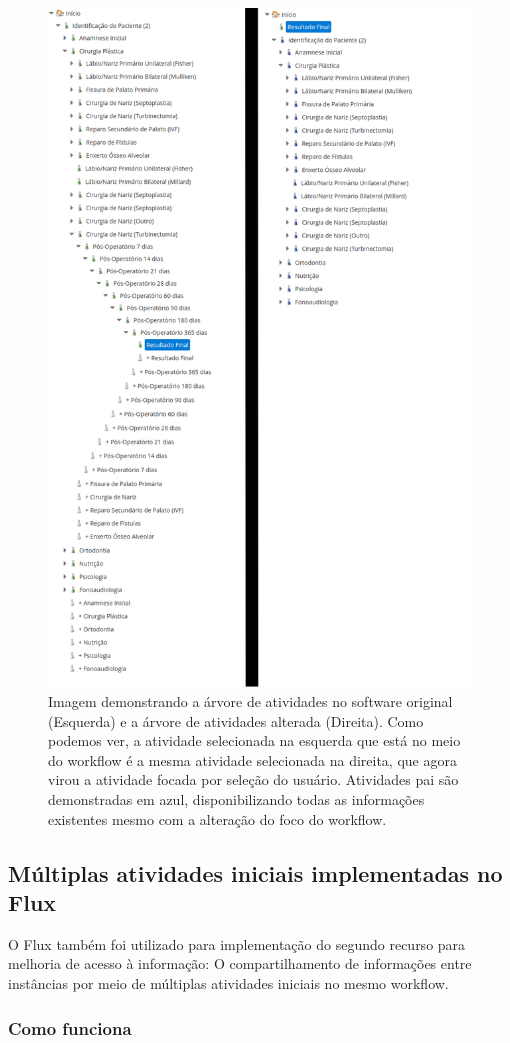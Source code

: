 \begin{figure}
    \centering
    \includegraphics[height=1\textwidth]{imgs/CENTRARE/arvoreNormalEAlterada.png}
    \caption{Imagem demonstrando a árvore de atividades no software original (Esquerda) e a árvore de atividades alterada (Direita). Como podemos ver, a atividade selecionada na esquerda que está no meio do workflow é a mesma atividade selecionada na direita, que agora virou a atividade focada por seleção do usuário. Atividades pai são demonstradas em azul, disponibilizando todas as informações existentes mesmo com a alteração do foco do workflow.}
    \label{fig:centrare_tree_normal_altered}
\end{figure}

\subsection{Múltiplas atividades iniciais implementadas no Flux}

O Flux também foi utilizado para implementação do segundo recurso para melhoria de acesso à informação: O compartilhamento de informações entre instâncias por meio de múltiplas atividades iniciais no mesmo workflow.

\subsubsection{Como funciona}


